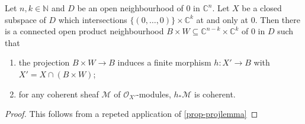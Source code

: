 \begin{corollary}\label{cor-projlemma}
    Let $n,k\in \mathbb{N}$ and $D$ be an open neighbourhood of $0$ in $\mathbb{C}^n$. 
    Let $X$ be a closed subspace of $D$ which intersections $\{(0,\ldots,0)\}\times \mathbb{C}^k$ at and only at $0$. Then there is a connected open product neighbourhood $B\times W\subseteq \mathbb{C}^{n-k}\times \mathbb{C}^k$ of $0$ in $D$ such that 
    \begin{enumerate}
        \item the projection $B\times W\rightarrow B$ induces a finite morphism $h:X'\rightarrow B$ with $X'=X\cap (B\times W)$;
        \item for any coherent sheaf $\mathcal{M}$ of $\mathcal{O}_{X'}$-modules, $h_*\mathcal{M}$ is coherent.
    \end{enumerate}
\end{corollary}
\begin{proof}
    This follows from a repeted application of \cref{prop-projlemma}
\end{proof}

